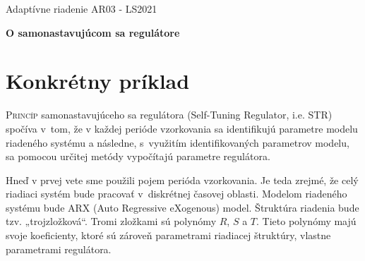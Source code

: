 \documentclass[a4paper, 10pt, ]{article}
\def\oznacenieCasti{AR03 - LS2021}
\begin{document}
\lstset{%
style=mystyle,
rangebeginprefix=\#\#\#\ cellB\ ,%
rangebeginsuffix=\ \#\#\#,%
rangeendprefix=\#\#\#\ cellE\ ,%
rangeendsuffix=\ \#\#\#,%
includerangemarker=false,
}






\fontsize{12pt}{22pt}\selectfont

\centerline{\textsf{Adaptívne riadenie} \hfill \textsf{\oznacenieCasti}}

\fontsize{18pt}{22pt}\selectfont





\begin{flushleft}
	\textbf{\textsf{O samonastavujúcom sa regulátore}}
\end{flushleft}





\normalsize

\bigskip

{\hypersetup{hidelinks}

\tableofcontents

}

\bigskip

\vspace{18pt}












\section{Konkrétny príklad}
\label{konkretPriklad}


\lettrine[lines=3, nindent=0pt]{P}{rincíp} samonastavujúceho sa regulátora (Self-Tuning Regulator, i.e. STR) spočíva v~tom, že v každej perióde vzorkovania sa identifikujú parametre modelu riadeného systému a následne, s~využitím identifikovaných parametrov modelu, sa pomocou určitej metódy vypočítajú parametre regulátora.

Hneď v prvej vete sme použili pojem perióda vzorkovania. Je teda zrejmé, že celý riadiaci systém bude pracovať v~diskrétnej časovej oblasti. Modelom riadeného systému bude ARX (Auto Regressive eXogenous) model. Štruktúra riadenia bude tzv.  „trojzložková“. Tromi zložkami sú polynómy $R$, $S$ a $T$. Tieto polynómy majú svoje koeficienty, ktoré sú zároveň parametrami riadiacej štruktúry, vlastne parametrami regulátora.
\end{document}
